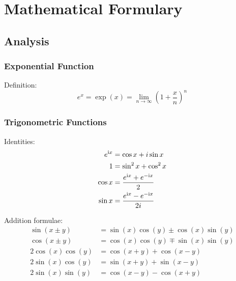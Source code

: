 \section{Mathematical Formulary}
	\subsection{Analysis}
		\subsubsection{Exponential Function}
			\noindent
			Definition:
			\begin{equation}
				e^x=\exp{(x)}=\lim_{n\rightarrow \infty}\left(1+\frac{x}{n}\right)^n
			\end{equation}

		\subsubsection{Trigonometric Functions}
			\noindent
			Identities:
			\begin{equation}
				\begin{split}
					e^{\mathrm{i} x}&=\cos x+i\sin x \\
					1&=\sin^{2}x+\cos^{2}x \\
					\cos{x}&=\frac{e^{\mathrm{i} x}+e^{-\mathrm{i} x}}{2} \\
					\sin{ x}&=\frac{e^{\mathrm{i} x}-e^{-\mathrm{i} x}}{2i} \\
				\end{split}
			\end{equation}

			\noindent

			Addition formulae:
			\begin{equation}
				\begin{split}
					\sin\left( x\pm y\right)&=\sin\left( x\right)\cos\left( y\right)\pm\cos\left( x\right)\sin\left( y\right) \\
					\cos\left( x\pm y\right)&=\cos\left( x\right)\cos\left( y\right)\mp\sin\left( x\right)\sin\left( y\right) \\
					2\cos( x)\cos( y)&=\cos( x+ y)+\cos( x- y) \\
					2\sin( x)\cos( y)&=\sin( x+ y)+\sin( x- y) \\
					2\sin( x)\sin( y)&=\cos( x- y)-\cos( x+ y) \\
				\end{split}
			\end{equation}

